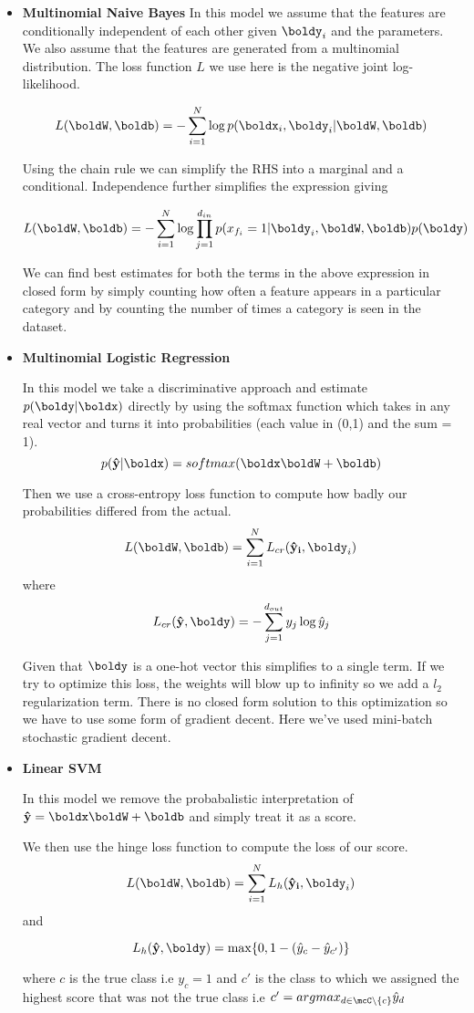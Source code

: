 \documentclass[11pt]{article}
\begin{document}
\begin{itemize}
  \item \textbf{Multinomial Naive Bayes}
  In this model we assume that the features are conditionally independent of each
  other given $\boldy_i$ and the parameters. We also assume that the features are
  generated from a multinomial distribution. The loss function $L$ we use here is the
  negative joint log-likelihood.

  $$L(\boldW,\boldb) = - \sum_{i=1}^N \log p(\boldx_i,\boldy_i | \boldW,\boldb)$$

  Using the chain rule we can simplify the RHS into a marginal and a conditional.
  Independence further simplifies the expression giving

  $$L(\boldW,\boldb) = - \sum_{i=1}^N \log \prod_{j=1}^{d_{in}}
    p(x_{f_i} = 1| \boldy_i, \boldW, \boldb) p(\boldy)$$

  We can find best estimates for both the terms in the above expression in closed
  form by simply counting how often a feature appears in a particular category
  and by counting the number of times a category is seen in the dataset.

  \item \textbf{Multinomial Logistic Regression}

  In this model we take a discriminative approach and estimate $p(\boldy|\boldx)$
  directly by using the softmax function which takes in any real vector and turns
  it into probabilities (each value in (0,1) and the sum = 1).
  $$ p(\bold{\hat{y}}|\boldx) = softmax(\boldx \boldW + \boldb) $$

  Then we use a cross-entropy loss function to compute how badly our probabilities
  differed from the actual.
  $$ L(\boldW, \boldb) = \sum_{i=1}^{N} L_{cr}(\bold{\hat{y}_i},\boldy_i) $$
  where
  $$ L_{cr}(\bold{\hat{y}},\boldy) = - \sum_{j=1}^{d_{out}} y_j \log \hat{y}_j $$

  Given that $\boldy$ is a one-hot vector this simplifies to a single term. If
  we try to optimize this loss, the weights will blow up to infinity so we add a
  $l_2$ regularization term. There is no closed form solution to this optimization
  so we have to use some form of gradient decent. Here we've used mini-batch
  stochastic gradient decent.

  \item \textbf{Linear SVM}

  In this model we remove the probabalistic interpretation of
  $\bold{\hat{y}} = \boldx \boldW + \boldb$ and simply treat it as a score.

  We then use the hinge loss function to compute the loss of our score.
  $$ L(\boldW, \boldb) = \sum_{i=1}^{N} L_{h}(\bold{\hat{y}_i},\boldy_i) $$
  and

  $$ L_h(\bold{\hat{y}},\boldy) = \max \{0,1 - (\hat{y}_c - \hat{y}_{c'}) \}$$

  where $c$ is the true class i.e $y_c = 1$ and $c'$ is the class to which
  we assigned the highest score that was not the true class i.e
  $c' = argmax_{d \in \mcC \setminus \{c\}} \hat{y}_d$

\end{itemize}
\end{document}
